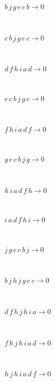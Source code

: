 \documentclass[rep10,leqno]{report}
\begin{document}
\begin{minipage}{6in}
$
b\,
 j\,
 g\,
 e\,
 c\,
 b\rightarrow 0
$
\end{minipage}\medskip \\
\begin{minipage}{6in}
$
c\,
 b\,
 j\,
 g\,
 e\,
 c\rightarrow 0
$
\end{minipage}\medskip \\
\begin{minipage}{6in}
$
d\,
 f\,
 h\,
 i\,
 a\,
 d\rightarrow 0
$
\end{minipage}\medskip \\
\begin{minipage}{6in}
$
e\,
 c\,
 b\,
 j\,
 g\,
 e\rightarrow 0
$
\end{minipage}\medskip \\
\begin{minipage}{6in}
$
f\,
 h\,
 i\,
 a\,
 d\,
 f\rightarrow 0
$
\end{minipage}\medskip \\
\begin{minipage}{6in}
$
g\,
 e\,
 c\,
 b\,
 j\,
 g\rightarrow 0
$
\end{minipage}\medskip \\
\begin{minipage}{6in}
$
h\,
 i\,
 a\,
 d\,
 f\,
 h\rightarrow 0
$
\end{minipage}\medskip \\
\begin{minipage}{6in}
$
i\,
 a\,
 d\,
 f\,
 h\,
 i\rightarrow 0
$
\end{minipage}\medskip \\
\begin{minipage}{6in}
$
j\,
 g\,
 e\,
 c\,
 b\,
 j\rightarrow 0
$
\end{minipage}\medskip \\
\begin{minipage}{6in}
$
b\,
 j\,
 h\,
 j\,
 g\,
 e\,
 c\rightarrow 0
$
\end{minipage}\medskip \\
\begin{minipage}{6in}
$
d\,
 f\,
 h\,
 j\,
 h\,
 i\,
 a\rightarrow 0
$
\end{minipage}\medskip \\
\begin{minipage}{6in}
$
f\,
 h\,
 j\,
 h\,
 i\,
 a\,
 d\rightarrow 0
$
\end{minipage}\medskip \\
\begin{minipage}{6in}
$
h\,
 j\,
 h\,
 i\,
 a\,
 d\,
 f\rightarrow 0
$
\end{minipage}\medskip \\
\end{document}
